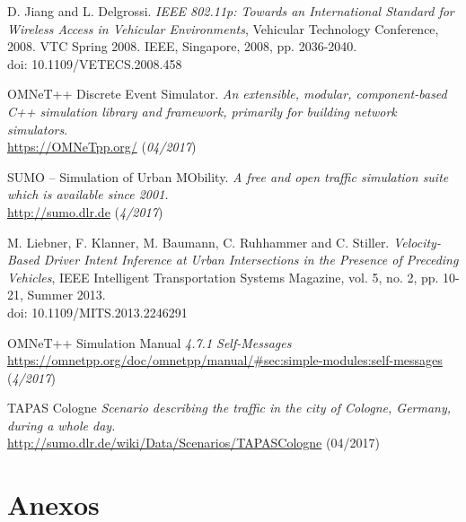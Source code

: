 \documentclass[11pt,letterpaper]{article}
\begin{document}
\begin{thebibliography}{5}
  		 D. Jiang and L. Delgrossi.
  		\textit{IEEE 802.11p: Towards an International Standard for Wireless Access in Vehicular Environments}, Vehicular Technology Conference, 2008. VTC Spring 2008. IEEE, Singapore, 2008, pp. 2036-2040.
  		\\doi: 10.1109/VETECS.2008.458

  		 OMNeT++ Discrete Event Simulator.
  		\textit{An extensible, modular, component-based C++ simulation library and framework, primarily for building network simulators}.
  		\\\url{https://OMNeTpp.org/} (\textit{04/2017})

  		 SUMO – Simulation of Urban MObility.
  		\textit{A free and open traffic simulation suite which is available since 2001.}
  		\\\url{http://sumo.dlr.de} (\textit{4/2017})

       M. Liebner, F. Klanner, M. Baumann, C. Ruhhammer and C. Stiller.
      \textit{Velocity-Based Driver Intent Inference at Urban Intersections in the Presence of Preceding Vehicles},
      IEEE Intelligent Transportation Systems Magazine, vol. 5, no. 2, pp. 10-21, Summer 2013.
      \\doi: 10.1109/MITS.2013.2246291

	   OMNeT++ Simulation Manual
	  \textit{4.7.1 Self-Messages}
	  \\\url{https://omnetpp.org/doc/omnetpp/manual/#sec:simple-modules:self-messages} (\textit{4/2017})

	   TAPAS Cologne
	  \textit{Scenario describing the traffic in the city of Cologne, Germany, during a whole day.}
	  \\\url{http://sumo.dlr.de/wiki/Data/Scenarios/TAPASCologne} (04/2017)

\end{thebibliography}
\newpage
\section{Anexos}
\end{document}
